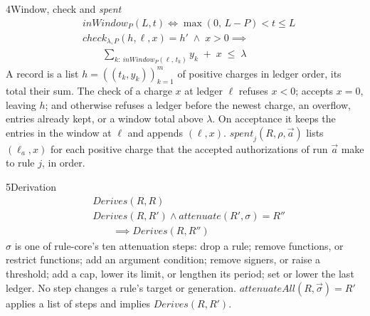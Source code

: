 \begin{perchdefinition}{4}{Window, check and \emph{spent}}\label{def:window-check-and-spent}
\[\begin{aligned}&\mathit{inWindow}_P(L, t) \iff \max(0,\, L - P) < t \le L\\
&\mathit{check}_{\lambda, P}(h, \ell, x) = h' \;\land\; x > 0 \implies\\
&\qquad \sum_{k:\ \mathit{inWindow}_P(\ell,\, t_k)} y_k \;+\; x \;\le\; \lambda\end{aligned}\]
A record is a list \(h = ((t_k, y_k))_{k=1}^{m}\) of positive charges in ledger order, its total their sum. The check of a charge \(x\) at ledger \(\ell\) refuses \(x < 0\); accepts \(x = 0\), leaving \(h\); and otherwise refuses a ledger before the newest charge, an overflow,  entries already kept, or a window total above \(\lambda\). On acceptance it keeps the entries in the window at \(\ell\) and appends \((\ell, x)\). \(\mathit{spent}_j(R, \rho, \vec a)\) lists \((\ell_a, x)\) for each positive charge that the accepted authorizations of run \(\vec a\) make to rule \(j\), in order.
\end{perchdefinition}
\begin{perchdefinition}{5}{Derivation}\label{def:derivation}
\[\begin{aligned}&\mathit{Derives}(R, R)\\
&\mathit{Derives}(R, R') \land \mathit{attenuate}(R', \sigma) = R''\\
&\qquad \implies \mathit{Derives}(R, R'')\end{aligned}\]
\(\sigma\) is one of rule-core's ten attenuation steps: drop a rule; remove functions, or restrict functions; add an argument condition; remove signers, or raise a threshold; add a cap, lower its limit, or lengthen its period; set or lower the last ledger. No step changes a rule's target or generation. \(\mathit{attenuateAll}(R, \vec\sigma) = R'\) applies a list of steps and implies \(\mathit{Derives}(R, R')\).
\end{perchdefinition}
